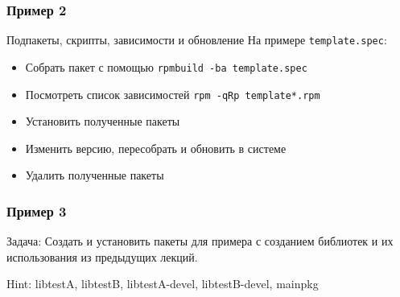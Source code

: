 \begin{frame}
	\frametitle{Пример 2}

	\begin{block}{Подпакеты, скрипты, зависимости и обновление}
		На примере {\tt template.spec}:

		\begin{itemize}
			\item Собрать пакет с помощью {\tt rpmbuild -ba template.spec}
			\item Посмотреть список зависимостей {\tt rpm -qRp template*.rpm}
			\item Установить полученные пакеты
			\item Изменить версию, пересобрать и обновить в системе
			\item Удалить полученные пакеты
		\end{itemize}
	\end{block}
\end{frame}

\begin{frame}
	\frametitle{Пример 3}

	\begin{block}{Задача:}
		Создать и установить пакеты для примера с созданием библиотек
		и их использования из предыдущих лекций.
	\end{block}

	Hint: libtestA, libtestB, libtestA-devel, libtestB-devel, mainpkg

\end{frame}

